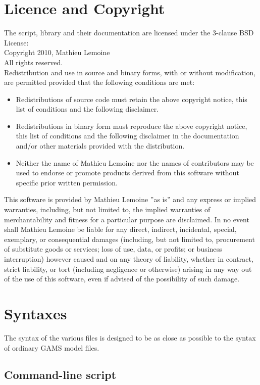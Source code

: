 \documentclass{article}
\begin{document}
\section*{Licence and Copyright}
The script, library and their documentation are licensed under the 3-clause BSD
License:\\
Copyright \textcopyright{} 2010, Mathieu Lemoine\\
All rights reserved.\\
% 
Redistribution and use in source and binary forms, with or without modification,
are permitted provided that the following conditions are met:
\begin{itemize}
\item Redistributions of source code must retain the above copyright notice,
  this list of conditions and the following disclaimer.
\item Redistributions in binary form must reproduce the above copyright notice,
  this list of conditions and the following disclaimer in the documentation
  and/or other materials provided with the distribution.
\item Neither the name of Mathieu Lemoine nor the names of contributors may be
  used to endorse or promote products derived from this software without
  specific prior written permission.
\end{itemize}
% 
This software is provided by Mathieu Lemoine ''as is'' and any express or
implied warranties, including, but not limited to, the implied warranties of
merchantability and fitness for a particular purpose are disclaimed. In no event
shall Mathieu Lemoine be liable for any direct, indirect, incidental, special,
exemplary, or consequential damages (including, but not limited to, procurement
of substitute goods or services; loss of use, data, or profits; or business
interruption) however caused and on any theory of liability, whether in
contract, strict liability, or tort (including negligence or otherwise) arising
in any way out of the use of this software, even if advised of the possibility
of such damage.

\section*{Syntaxes}

The syntax of the various files is designed to be as close as possible to the
syntax of ordinary GAMS model files.

\subsection*{Command-line script}
\end{document}
